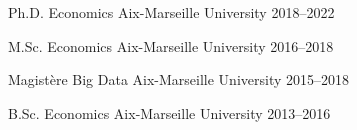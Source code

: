 


\begin{cvhonors}

  
  \cvhonor
    {Ph.D. Economics} %
    {} %
    {Aix-Marseille University} %
    {2018--2022} %
    
  \cvhonor
    {M.Sc. Economics} %
    {} %
    {Aix-Marseille University} %
    {2016--2018} %
    
  \cvhonor
    {Magistère Big Data} %
    {} %
    {Aix-Marseille University} %
    {2015--2018} %
    
  \cvhonor
    {B.Sc. Economics} %
    {} %
    {Aix-Marseille University} %
    {2013--2016} %
    
\end{cvhonors}
